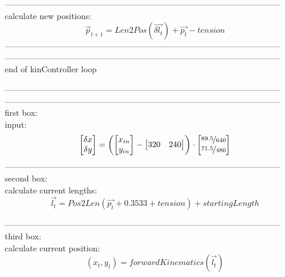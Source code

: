 \documentclass{article}
\begin{document}
	---------------------------------------------------------------------------------------------------\\
	
	calculate new positions:\\
	\[
	\vec{p}_{t+1} = Len2Pos \left(
	\vec{\delta{l_t}}
	\right)
	+ \vec{p_t} - tension
	\]
	---------------------------------------------------------------------------------------------------\\
	---------------------------------------------------------------------------------------------------\\
	end of kinController loop
	\newpage

---------------------------------------------------------------------------------------------------\\
---------------------------------------------------------------------------------------------------\\
first box:\\

input:\\
\[
\begin{bmatrix}
\delta{x}\\
\delta{y}
\end{bmatrix}
=
\left(
\begin{bmatrix}
x_{in}\\
y_{in}
\end{bmatrix}
-
\begin{bmatrix}
320 & 240
\end{bmatrix}
\right)
\cdot
\begin{bmatrix}
\nicefrac{89.5}{640}\\
\nicefrac{71.5}{480}
\end{bmatrix}
\]
 	---------------------------------------------------------------------------------------------------\\
 	
second box:\\
calculate current lengths:\\

	\[
	\vec{l_t} = Pos2Len
	\left(
	\vec{p_t} + 0.3533 + tension
	\right) + startingLength
	\]
 		
 		  	---------------------------------------------------------------------------------------------------\\
 		  	
third box:\\
calculate current position:\\
\[
(x_t,y_t) = forwardKinematics 
\left(
\vec{l_t}
\right)
\]
\end{document}
